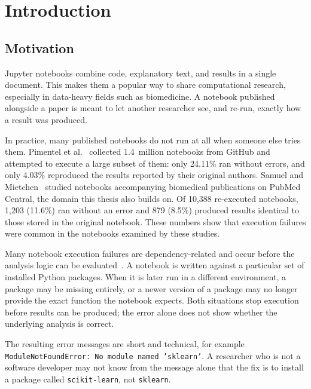 \chapter{Introduction}
\label{chap:introduction}

\section{Motivation}
\label{sec:intro-motivation}

Jupyter notebooks combine code, explanatory text, and results in a single
document. This makes them a popular way to share computational research,
especially in data-heavy fields such as biomedicine. A notebook published
alongside a paper is meant to let another researcher see, and re-run, exactly
how a result was produced.

In practice, many published notebooks do not run at all when someone else
tries them. Pimentel et al.~\cite{pimentel2019msr} collected 1.4~million
notebooks from GitHub and attempted to execute a large subset of them: only
24.11\% ran without errors, and only 4.03\% reproduced the results reported by
their original authors. Samuel and Mietchen~\cite{samuel2024gigascience}
studied notebooks accompanying biomedical publications on PubMed Central, the
domain this thesis also builds on. Of 10,388 re-executed notebooks, 1,203
(11.6\%) ran without an error and 879 (8.5\%) produced results identical to
those stored in the original notebook. These numbers show that execution failures 
were common in the notebooks examined by these studies.

Many notebook execution failures are dependency-related and occur before the
analysis logic can be evaluated~\cite{pimentel2019msr,samuel2024gigascience}.
A notebook is written against a particular set of installed Python packages.
When it is later run in a different environment, a package may be missing
entirely, or a newer version of a package may no longer provide the exact
function the notebook expects. Both situations stop execution before results can
be produced; the error alone does not show whether the underlying analysis is
correct.

\begin{sloppypar}
The resulting error messages are short and technical, for example
\texttt{ModuleNotFoundError: No module named 'sklearn'}. A researcher who
is not a software developer may not know from the message alone that the
fix is to install a package called \texttt{scikit-learn}, not
\texttt{sklearn}.
\end{sloppypar}

